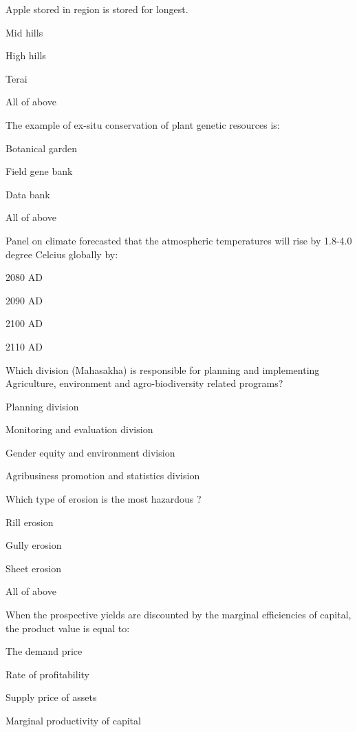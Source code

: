 \begin{questions}
\question Apple stored in \fillin[][3cm] region is stored for longest.
  \begin{items}
  \item Mid hills
  \item High hills
  \item Terai
  \item All of above
  \end{items}

\question The example of ex-situ conservation of plant genetic resources is:
  \begin{items}
  \item Botanical garden
  \item Field gene bank
  \item Data bank
  \item All of above
  \end{items}

\question Panel on climate forecasted that the atmospheric temperatures will rise by 1.8-4.0 degree Celcius globally by:
  \begin{items}
  \item 2080 AD
  \item 2090 AD
  \item 2100 AD
  \item 2110 AD
  \end{items}

\question Which division (Mahasakha) is responsible for planning and implementing Agriculture, environment and agro-biodiversity related programs?
  \begin{items}
  \item Planning division
  \item Monitoring and evaluation division
  \item Gender equity and environment division
  \item Agribusiness promotion and statistics division
  \end{items}

\question Which type of erosion is the most hazardous ?
  \begin{items}
  \item Rill erosion
  \item Gully erosion
  \item Sheet erosion
  \item All of above
  \end{items}

\question When the prospective yields are discounted by the marginal efficiencies of capital, the product value is equal to:
  \begin{items}
  \item The demand price
  \item Rate of profitability
  \item Supply price of assets
  \item Marginal productivity of capital
  \end{items}


\end{questions}
